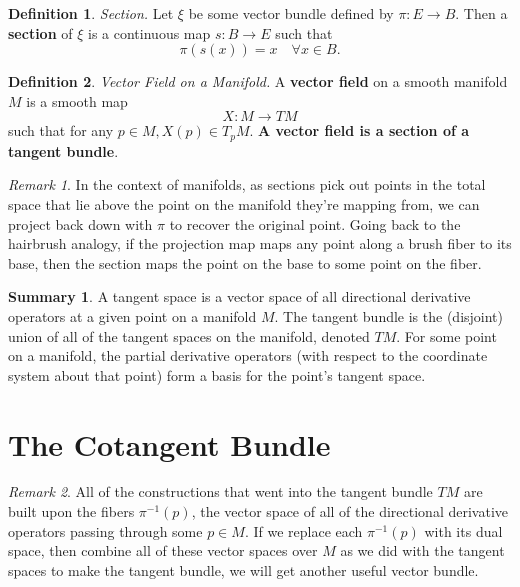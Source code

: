 \documentclass[10pt,landscape]{article}
\theoremstyle{definition}
\newtheorem{definition}{Definition}[section]
\theoremstyle{theorem}
\theoremstyle{summary}
\newtheorem*{summary}{Summary}
\theoremstyle{remark}
\newtheorem*{remark}{Remark}
\begin{document}
\begin{multicols*}{3}
\theoremstyle{definition}
\begin{definition}{\textit{Section.}}
    Let $\xi$ be some vector bundle defined by $\pi:E\rightarrow B$. Then a \textbf{section} of $\xi$ is a continuous map $s:B\rightarrow E$ such that 
    \begin{equation}
        \pi(s(x)) = x \quad \forall x\in B.
    \end{equation}
\end{definition}

\theoremstyle{definition}
\begin{definition}{\textit{Vector Field on a Manifold.}}
\label{def_vectorfield}
    A \textbf{vector field} on a smooth manifold $M$ is a smooth map 
    \begin{equation}
        X:M\rightarrow TM
    \end{equation}
    such that for any $p\in M, X(p) \in T_pM$. \textbf{A vector field is a section of a tangent bundle}.
\end{definition}

\begin{remark}
    In the context of manifolds, as sections pick out points in the total space that lie above the point on the manifold they're mapping from, we can project back down with $\pi$ to recover the original point. Going back to the hairbrush analogy, if the projection map maps any point along a brush fiber to its base, then the section maps the point on the base to some point on the fiber.
\end{remark}

\begin{summary}
    A tangent space is a vector space of all directional derivative operators at a given point on a manifold $M$. The tangent bundle is the (disjoint) union of all of the tangent spaces on the manifold, denoted $TM$. For some point on a manifold, the partial derivative operators (with respect to the coordinate system about that point) form a basis for the point's tangent space.
\end{summary}

\section{The Cotangent Bundle}

\begin{remark}
    All of the constructions that went into the tangent bundle $TM$ are built upon the fibers $\pi^{-1}(p)$, the vector space of all of the directional derivative operators passing through some $p\in M$. If we replace each $\pi^{-1}(p)$ with its dual space, then combine all of these vector spaces over $M$ as we did with the tangent spaces to make the tangent bundle, we will get another useful vector bundle.
\end{remark}


\end{multicols*}
\end{document}
